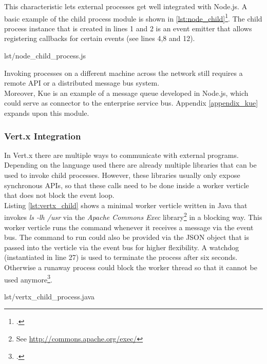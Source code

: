 This characteristic lets external processes get well integrated with Node.js.
A basic example of the child process module is shown in \autoref{lst:node_child}\footcite[Taken from][]{node_child_process}.
The child process instance that is created in lines 1 and 2 is an event emitter that
allows registering callbacks for certain events (see lines 4,8 and 12).

%
{lst/node_child_process.js}

Invoking processes on a different machine across the network still
requires a remote API or a distributed message bus system.\\

Moreover, Kue is an example of a message queue developed in Node.js, which could serve as connector to the enterprise service bus. Appendix \ref{appendix_kue} expands upon this module.


\subsubsection{Vert.x Integration}
\label{vertx_integration}
In Vert.x there are multiple ways to communicate with external programs.
Depending on the language used there are already multiple libraries that can be
used to invoke child processes. However, these libraries usually only expose
synchronous APIs, so that these calls need to be done inside a worker verticle
that does not block the event loop.\\
Listing \ref{lst:vertx_child} shows a minimal worker verticle written in Java
that invokes \textit{ls -lh /usr} via the \textit{Apache Commons Exec}
library\footnote{See \url{http://commons.apache.org/exec/}} in a blocking way.
This worker verticle runs the command whenever it receives a message via the event bus.
The command to run could also be provided via the JSON object that is passed
into the verticle via the event bus for higher flexibility. A watchdog
(instantiated in line 27) is used to terminate the process after six seconds.
Otherwise a runaway process could block the worker thread so that it cannot be
used anymore\footcite[Cf.][67]{Evi_2007}.

%
{lst/vertx_child_process.java}

